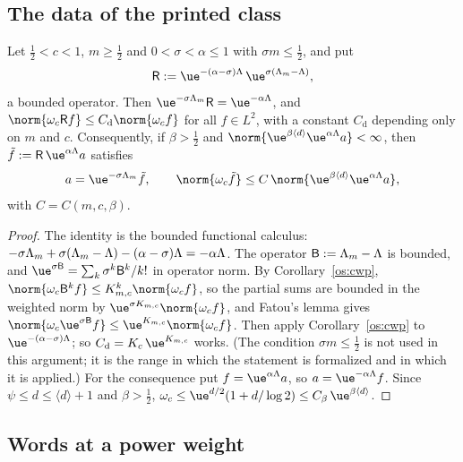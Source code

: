 \subsection{The data of the printed class}

\begin{proposition}\label{os:data}
Let $\tfrac12<c<1$, $m\ge\tfrac12$ and $0<\sigma<\alpha\le1$ with $\sigma m\le\tfrac12$, and put
\[
\mathsf R:=\ue^{-(\alpha-\sigma)\osLam}\,\ue^{\sigma(\Lambda_m-\osLam)},
\]
a bounded operator. Then $\ue^{-\sigma\Lambda_m}\mathsf R=\ue^{-\alpha\osLam}$, and
$\norm{\osomc\mathsf Rf}\le C_{\mathrm d}\norm{\osomc f}$ for all $f\in L^2$, with a constant $C_{\mathrm d}$ depending only on $m$ and $c$.
Consequently, if $\beta>\tfrac12$ and $\norm{\ue^{\beta\langle d\rangle}\ue^{\alpha\osLam}a}<\infty$, then $\tilde f:=\mathsf R\,\ue^{\alpha\osLam}a$ satisfies
\[
a=\ue^{-\sigma\Lambda_m}\tilde f,\qquad\norm{\osomc\tilde f}\le C\,\norm{\ue^{\beta\langle d\rangle}\ue^{\alpha\osLam}a},
\]
with $C=C(m,c,\beta)$.
\end{proposition}
\begin{proof}
The identity is the bounded functional calculus: $-\sigma\Lambda_m+\sigma(\Lambda_m-\Lambda)-(\alpha-\sigma)\Lambda=-\alpha\Lambda$. The operator
$\mathsf B:=\Lambda_m-\Lambda$ is bounded, and $\ue^{\sigma\mathsf B}=\sum_k\sigma^k\mathsf B^k/k!$ in operator norm. By Corollary~\ref{os:cwp},
$\norm{\osomc\mathsf B^kf}\le K_{m,c}^k\norm{\osomc f}$, so the partial sums are bounded in the weighted norm by $\ue^{\sigma K_{m,c}}\norm{\osomc f}$, and
Fatou's lemma gives $\norm{\osomc\ue^{\sigma\mathsf B}f}\le\ue^{K_{m,c}}\norm{\osomc f}$. Then apply Corollary~\ref{os:cwp} to
$\ue^{-(\alpha-\sigma)\osLam}$; so $C_{\mathrm d}=K_c\,\ue^{K_{m,c}}$ works. (The condition $\sigma m\le\tfrac12$ is not used in this argument; it
is the range in which the statement is formalized and in which it is applied.) For the consequence put $f=\ue^{\alpha\osLam}a$, so $a=\ue^{-\alpha\osLam}f$. Since $\psi\le d\le\langle d\rangle+1$ and
$\beta>\tfrac12$, $\osomc\le\ue^{d/2}(1+d/\log2)\le C_\beta\,\ue^{\beta\langle d\rangle}$.
\end{proof}

\subsection{Words at a power weight}

